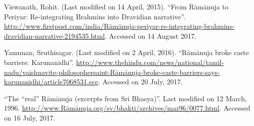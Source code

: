 \begin{thebibliography}{99}
  Viswanath, Rohit. (Last modified on 14 April, 2015). “From Rāmānuja to Periyar: Re-integrating Brahmins into Dravidian narrative”. \url{http://www.firstpost.com/india/Rāmānuja-periyar-re-integrating-brahmins-dravidian-narrative-2194535.html}. Accessed on 14 August 2017.

  Yamunan, Sruthisagar. (Last modified on 2 April, 2016). “Rāmānuja broke caste barriers: Karunanidhi”. \url{http://www.thehindu.com/news/national/tamil-nadu/vaishnavite-philosophersaint-Rāmānuja-broke-caste-barriers-says-karunanidhi/article7068531.ece}. Accessed on 20 July, 2017.

  “The “real” Rāmānuja (excerpts from Sri Bhasya)”. Last modified on 12 March, 1996. \url{http://www.Rāmānuja.org/sv/bhakti/archives/mar96/0077.html}. Accessed on 16 July, 2017.

 \end{thebibliography}

